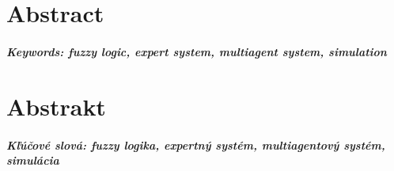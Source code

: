 \documentclass[12pt, twoside, openany]{book}
\begin{document}
\newpage 
\thispagestyle{empty}
\chapter*{Abstract}\label{chap:abstract_en}


\paragraph*{Keywords: fuzzy logic, expert system, multiagent system, simulation}  


\newpage 
\thispagestyle{empty}
\chapter*{Abstrakt}\label{chap:abstract_sk}


\paragraph*{Kľúčové slová: fuzzy logika, expertný systém, multiagentový systém, simulácia}




\newpage 
\tableofcontents




\mainmatter







\backmatter

\nocite{*}



\end{document}
